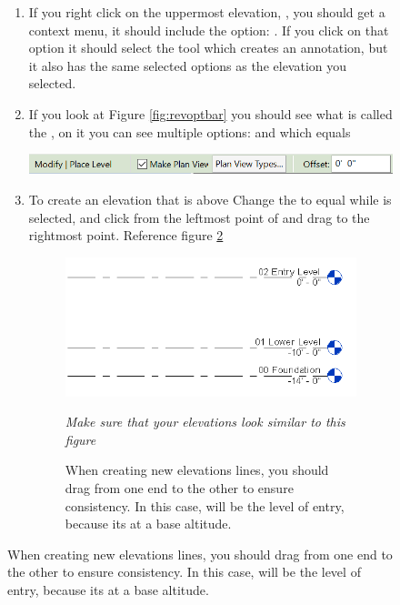 \documentclass{tufte-book} %
\begin{document}
\begin{figure}
\begin{enumerate}
	
	\section{Creating additional elevations}
	\item If you right click on the uppermost elevation, , you should get a context menu, it should include the option: . If you click on that option it should select the  tool which creates an annotation, but it also has the same selected options as the elevation you selected.
	\item If you look at Figure \ref{fig:revoptbar} you should see what is called the , on it you can see multiple options:  and  which equals 
	
	\begin{marginfigure}
		\includegraphics[width=\linewidth]{revitoptionsbar.png}
		\caption[The revit options bar]{The options bar, which is mostly used to set chain settings and offsets}
		\label{fig:revoptbar}
	
	\end{marginfigure}
	
	\item To create an elevation that is  above  Change the  to equal  while  is selected, and click from the leftmost point of  and drag to the rightmost point. Reference figure \ref{fig:revelevlinethree}
	
	\begin{figure}
		\includegraphics[width=\linewidth]{revitelevationlinethree.png}
		\caption[Shortened elevation lines]{When creating new elevations lines, you should drag from one end to the other to ensure consistency. In this case,  will be the level of entry, because its at a base altitude.}
		\emph{Make sure that your elevations look similar to this figure}
		\label{fig:revelevlinethree}
	\end{figure}
	

\end{enumerate}
\end{figure}
\end{document}
